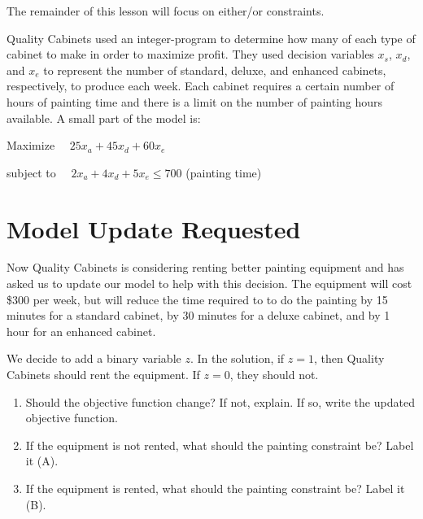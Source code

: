 \documentclass[11pt]{article}
\theoremstyle{definition}
\begin{document}
The remainder of this lesson will focus on either/or constraints.

Quality Cabinets used an integer-program to determine how many of each type of cabinet to make in order to maximize profit. They used decision variables $x_s$, $x_d$, and $x_e$ to represent the number of standard, deluxe, and enhanced cabinets, respectively, to produce each week. Each cabinet requires a certain number of hours of painting time and there is a limit on the number of painting hours available. A small part of the model is:

\begin{tcolorbox}
Maximize ~~$25x_a + 45x_d + 60x_e$

\smallskip
subject to ~~$2x_a + 4x_d + 5x_e \leq 700$ \hspace{1in} (painting time)
\end{tcolorbox} \vspace{1in}

\section{Model Update Requested}
Now Quality Cabinets is considering renting better painting equipment and has asked us to update our model to help with this decision.  The equipment will cost \$300 per week, but will reduce the time required to to do the painting by 15 minutes for a standard cabinet, by 30 minutes for a deluxe cabinet, and by 1 hour for an enhanced cabinet.

We decide to add a binary variable $z$.  In the solution, if $z = 1$, then Quality Cabinets should rent the equipment.  If $z = 0$, they should not.  

\begin{enumerate}[resume]
\item Should the objective function change?  If not, explain.  If so, write the updated objective function.\\
\vspace{2in}

\item If the equipment is not rented, what should the painting constraint be?  Label it (A). \vspace{1in}

\item If the equipment is rented, what should the painting constraint be?  Label it (B). \vspace{1in}
\end{enumerate}
\end{document}
